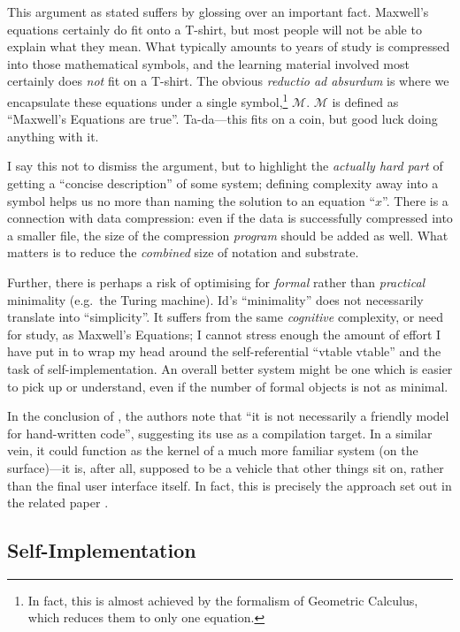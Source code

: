 This argument as stated suffers by glossing over an important fact.
Maxwell's equations certainly do fit onto a T-shirt, but most people
will not be able to explain what they mean. What typically amounts to
years of study is compressed into those mathematical symbols, and the
learning material involved most certainly does \emph{not} fit on a
T-shirt. The obvious \emph{reductio ad absurdum} is where we encapsulate
these equations under a single symbol,\footnote{In fact, this is almost
  achieved by the formalism of Geometric Calculus, which reduces them to
  only one equation.} \(\mathcal{M}\). \(\mathcal{M}\) is defined as
``Maxwell's Equations are true''. Ta-da---this fits on a coin, but good
luck doing anything with it.

I say this not to dismiss the argument, but to highlight the
\emph{actually hard part} of getting a ``concise description'' of some
system; defining complexity away into a symbol helps us no more than
naming the solution to an equation ``\(x\)''. There is a connection with
data compression: even if the data is successfully compressed into a
smaller file, the size of the compression \emph{program} should be added
as well. What matters is to reduce the \emph{combined} size of notation
and substrate.

Further, there is perhaps a risk of optimising for \emph{formal} rather
than \emph{practical} minimality (e.g.~the Turing machine). Id{}'s
``minimality'' does not necessarily translate into ``simplicity''. It
suffers from the same \emph{cognitive} complexity, or need for study, as
Maxwell's Equations; I cannot stress enough the amount of effort I have
put in to wrap my head around the self-referential ``vtable vtable'' and
the task of self-implementation. An overall better system might be one
which is easier to pick up or understand, even if the number of formal
objects is not as minimal.

In the conclusion of \cite{OROM}, the authors note that ``it is not
necessarily a friendly model for hand-written code'', suggesting its use
as a compilation target. In a similar vein, it could function as the
kernel of a much more familiar system (on the surface)---it is, after
all, supposed to be a vehicle that other things sit on, rather than the
final user interface itself. In fact, this is precisely the approach set
out in the related paper \cite{COLAs}.

\hypertarget{self-implementation}{%
\subsection{Self-Implementation}\label{self-implementation}}

